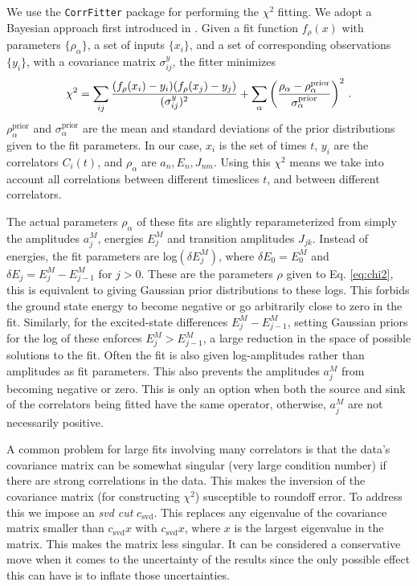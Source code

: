 We use the \texttt{CorrFitter} package \cite{CorrFitter} for performing the $\chi^2$ fitting. We adopt a Bayesian approach first introduced in \cite{Lepage:2001ym}. Given a fit function $f_{\rho}(x)$ with parameters $\{\rho_{\alpha}\}$, a set of inputs $\{x_i\}$, and a set of corresponding observations $\{y_i\}$, with a covariance matrix $\sigma^y_{ij}$, the fitter minimizes
\begin{align}
  \chi^2 = \sum_{ij} {( f_{\rho}(x_i) - y_i )( f_{\rho}(x_j) - y_j )\over (\sigma_{ij}^y)^2} + \sum_{\alpha}\left({\rho_{\alpha}-\rho^{\text{prior}}_{\alpha}\over\sigma_{\alpha}^{\text{prior}}}\right)^2\,.
  \label{eq:chi2}
\end{align}
$\rho_{\alpha}^{\text{prior}}$ and $\sigma_{\alpha}^{\text{prior}}$ are the mean and standard deviations of the prior distributions given to the fit parameters. In our case, $x_i$ is the set of times $t$, $y_i$ are the correlators $C_i(t)$, and $\rho_{\alpha}$ are $a_n,E_n,J_{nm}$. Using this $\chi^2$ means we take into account all correlations between different timeslices $t$, and between different correlators.

The actual parameters $\rho_{\alpha}$ of these fits are slightly reparameterized from simply the amplitudes $a_j^M$, energies $E_j^M$ and transition amplitudes $J_{jk}$. Instead of energies, the fit parameters are log$(\delta E_j^M)$, where $\delta E_0=E_0^M$ and $\delta E_j=E_j^M-E_{j-1}^M$ for $j>0$. These are the parameters $\rho$ given to Eq. \eqref{eq:chi2}, this is equivalent to giving Gaussian prior distributions to these logs. This forbids the ground state energy to become negative or go arbitrarily close to zero in the fit. Similarly, for the excited-state differences $E_j^M-E_{j-1}^M$, setting Gaussian priors for the log of these enforces $E_j^M > E_{j-1}^M$, a large reduction in the space of possible solutions to the fit. Often the fit is also given log-amplitudes rather than amplitudes as fit parameters. This also prevents the amplitudes $a_j^M$ from becoming negative or zero. This is only an option when both the source and sink of the correlators being fitted have the same operator, otherwise, $a_j^M$ are not necessarily positive.

A common problem for large fits involving many correlators is that the data’s covariance matrix can be somewhat singular (very large condition number) if there are strong correlations in the data. This makes the inversion of the covariance matrix (for constructing $\chi^2$) susceptible to roundoff error. To address this we impose an {\it{svd cut}} $c_{\text{svd}}$. This replaces any eigenvalue of the covariance matrix smaller than $c_{\text{svd}} x$ with $c_{\text{svd}}x$, where $x$ is the largest eigenvalue in the matrix. This makes the matrix less singular. It can be considered a conservative move when it comes to the uncertainty of the results since the only possible effect this can have is to inflate those uncertainties.

